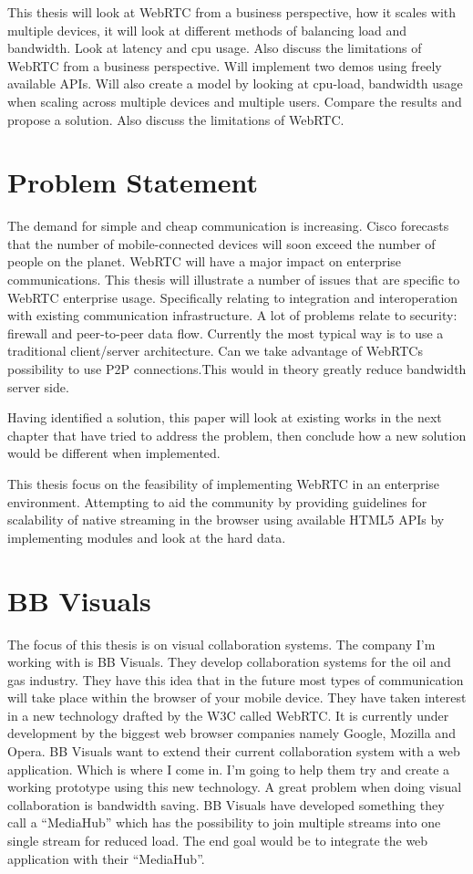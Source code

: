 This thesis will look at WebRTC from a business perspective, how it scales with multiple devices, it will look at different methods of balancing load and bandwidth. Look at latency and cpu usage. Also discuss the limitations of WebRTC from a business perspective. 
Will implement two demos using freely available APIs. Will also create a model by looking at cpu-load, bandwidth usage when scaling across multiple devices and multiple users. Compare the results and propose a solution. Also discuss the limitations of WebRTC.


\section{Problem Statement}
The demand for simple and cheap communication is increasing. Cisco forecasts that the number of mobile-connected devices will soon exceed the number of people on the planet. WebRTC will have a major impact on enterprise communications. This thesis will illustrate  a number of issues that are specific to WebRTC enterprise usage. Specifically relating to integration and interoperation with existing communication infrastructure. A lot of problems relate to security: firewall and peer-to-peer data flow. Currently the most typical way is to use a traditional client/server architecture. Can we take advantage of WebRTCs possibility to use P2P connections.This would in theory greatly reduce bandwidth server side.

Having identified a solution, this paper will look at existing works in the next chapter that have tried to address the problem, then conclude how a new solution would be different when implemented.

This thesis focus on the feasibility of implementing WebRTC in an enterprise environment. Attempting to aid the community by providing guidelines for scalability of native streaming in the browser using available HTML5 APIs by implementing modules and look at the hard data.


\section{BB Visuals}
The focus of this thesis is on visual collaboration systems. The company I’m working with is BB Visuals. They develop collaboration systems for the oil and gas industry. They have this idea that in the future most types of communication will take place within the browser of your mobile device. They have taken interest in a new technology drafted by the W3C called WebRTC. It is currently under development by the biggest web browser companies namely Google, Mozilla and Opera. BB Visuals want to extend their current collaboration system with a web application. Which is where I come in. I’m going to help them try and create a working prototype using this new technology. A great problem when doing visual collaboration is bandwidth saving. BB Visuals have developed something they call a “MediaHub” which has the possibility to join multiple streams into one single stream for reduced load. The end goal would be to integrate the web application with their “MediaHub”.


